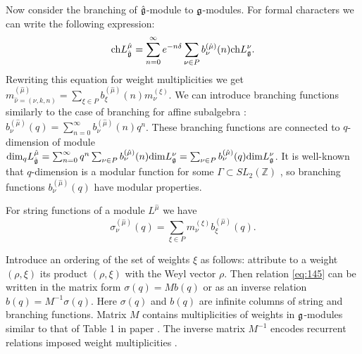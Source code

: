 Now consider the branching of $\hat{\mathfrak{g}}$-module to $\mathfrak{g}$-modules. For
formal characters we can write the following expression:
\begin{equation}
  \label{eq:149}
\mathrm{ch}L^{\hat{\mu}}_{\hat{\mathfrak{g}}}=\sum_{n=0}^{\infty}e^{-n\delta} \sum_{\nu\in P} b^{(\hat{\mu})}_{\nu}(n) \mathrm{ch} L^{\nu}_{\mathfrak{g}}.
\end{equation}
Rewriting this equation for weight multiplicities we get
$m^{(\hat{\mu})}_{\hat{\nu}=(\nu,k,n)}=\sum_{\xi\in P}
b^{(\hat{\mu})}_{\xi}(n) m^{(\xi)}_{\nu}$. We can introduce
branching functions similarly to the case of branching for affine
subalgebra \cite{kac1988modular,kac1990idl}:
$b^{(\hat{\mu})}_{\nu}(q)=\sum_{n=0}^{\infty}
b^{(\hat{\mu})}_{\nu}(n) q^{n}$.  These branching functions are connected to $q$-dimension of module $\mathrm{dim}_{q}L^{\hat \mu}_{\hat{\mathfrak{g}}}=\sum_{n=0}^{\infty}q^{n}\sum_{\nu\in P} b^{(\hat \mu)}_{\nu}(n) \mathrm{dim }L^{\nu}_{\mathfrak{g}}=\sum_{\nu\in P}b^{(\hat\mu)}_{\nu}(q) \mathrm{dim} L^{\nu}_{\mathfrak{g}}$. It is well-known that $q$-dimension is a modular function for some $\Gamma\subset SL_{2}(\mathbb{Z})$  \cite{gannon2006moonshine}, so branching functions $b^{(\hat \mu)}_{\nu}(q)$ have modular properties.

 For string functions of a module
$L^{\hat{\mu}}$ we have
\begin{equation}
  \label{eq:145}
   \sigma^{(\hat{\mu})}_{\nu}(q) = \sum_{\xi\in P} m^{(\xi)}_{\nu} b^{(\hat{\mu})}_{\xi}(q).
\end{equation}

Introduce an ordering of the set of weights $\xi$ as follows:
attribute to a weight $(\rho,\xi)$ its product $(\rho,\xi)$ with
the Weyl vector $\rho$. Then relation \eqref{eq:145} can be written
in the matrix form $\sigma(q)=M b(q)$ or as an inverse relation
$b(q)=M^{-1}\sigma(q)$. Here $\sigma(q)$ and $b(q)$ are infinite
columns of string and branching functions. Matrix $M$ contains
multiplicities of weights in $\mathfrak{g}$-modules similar to that of
Table 1 in paper \cite{2010arXiv1001}. The inverse matrix $M^{-1}$
encodes recurrent relations imposed weight multiplicities
\cite{il2010folded}.

